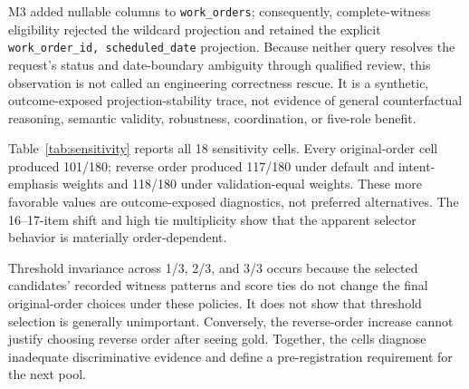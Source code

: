 \documentclass[applsci,article,submit,moreauthors]{Definitions/mdpi}
\begin{document}
M3 added nullable columns to \texttt{work\_orders}; consequently, complete-witness eligibility rejected the wildcard projection and retained the explicit \texttt{work\_order\_id, scheduled\_date} projection. Because neither query resolves the request's status and date-boundary ambiguity through qualified review, this observation is not called an engineering correctness rescue. It is a synthetic, outcome-exposed projection-stability trace, not evidence of general counterfactual reasoning, semantic validity, robustness, coordination, or five-role benefit.

Table~\ref{tab:sensitivity} reports all 18 sensitivity cells. Every original-order cell produced 101/180; reverse order produced 117/180 under default and intent-emphasis weights and 118/180 under validation-equal weights. These more favorable values are outcome-exposed diagnostics, not preferred alternatives. The 16--17-item shift and high tie multiplicity show that the apparent selector behavior is materially order-dependent.

Threshold invariance across 1/3, 2/3, and 3/3 occurs because the selected candidates' recorded witness patterns and score ties do not change the final original-order choices under these policies. It does not show that threshold selection is generally unimportant. Conversely, the reverse-order increase cannot justify choosing reverse order after seeing gold. Together, the cells diagnose inadequate discriminative evidence and define a pre-registration requirement for the next pool.

\begin{table}[htbp]
\caption{Complete-witness selector sensitivity summarized across invariant-pass thresholds. Results were identical at 1/3, 2/3, and 3/3 for every weight/order pair; coverage was 180/180 throughout.}
\label{tab:sensitivity}
\centering
\small
{}
\end{table}
\end{document}
